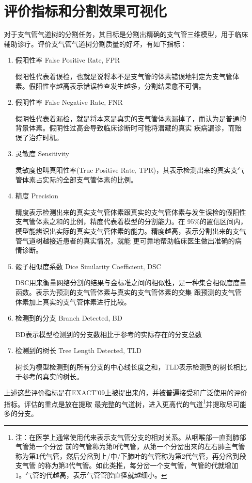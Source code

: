\section{评价指标和分割效果可视化}
对于支气管气道树的分割任务，其目标是分割出精确的支气管三维模型，用于临床辅助诊疗。评价支气管气道树分割质量的好坏，有如下指标：
\begin{enumerate}
    \item 假阳性率 False Positive Rate, FPR
    
    假阳性代表着误检，也就是说将本不是支气管的体素错误地判定为支气管体素。假阳性率越高表示错误检查发生越多，分割结果愈不可信。
    
    \item 假阴性率 False Negative Rate, FNR
    
    假阴性代表着漏检，就是将本来是真实的支气管体素漏掉了，而认为是普通的背景体素。假阴性过高会导致临床诊断时可能将潜藏的真实
    疾病漏诊，而贻误了治疗时机。
    
    \item 灵敏度 Sensitivity
    
    灵敏度也叫真阳性率(True Positive Rate, TPR)，其表示检测出来的真实支气管体素占实际的全部支气管体素的比例。 
    
    \item 精度 Precision
    
    精度表示检测出来的真实支气管体素跟真实的支气管体素与发生误检的假阳性支气管体素之和的比例，精度代表着模型的分割能力。在
    95\%的置信区间内，模型能辨识出实际的真实支气管体素的能力。精度越高，表示分割出来的支气管气道树越接近患者的真实情况，就能
    更可靠地帮助临床医生做出准确的病情诊断。
    
    \item 骰子相似度系数 Dice Similarity Coefficient, DSC
    
    DSC用来衡量网络分割的结果与金标准之间的相似性，是一种集合相似度度量函数。表示为预测的支气管体素与真实的支气管体素的交集
    跟预测的支气管体素加上真实的支气管体素进行比较。
    
    \item 检测到的分支 Branch Detected, BD
    
    BD表示模型检测到的分支数相比于参考的实际存在的分支总数
    
    \item 检测到的树长 Tree Length Detected, TLD
    
    树长为模型检测到的所有分支的中心线长度之和，TLD表示检测到的树长相比于参考的真实的树长。
\end{enumerate}
上述这些评价指标是在EXACT'09\cite{Lo2012ExtractionOA}上被提出来的，并被普遍接受和广泛使用的评价指标。评估的重点是放在提取
最完整的气道树，进入更高代的气道\footnote{注：在医学上通常使用代来表示支气管分支的相对关系。从咽喉部一直到肺部气管第一个分岔
前的气管称为第0代气管，从第一个分岔出来的左右肺主气管称为第1代气管，然后分岔到上/中/下肺叶的气管称为第2代气管，再分岔到段支气管
的称为第3代气管。如此类推，每分岔一个支气管，气管的代就增加1。气管的代越高，表示气管管腔直径就越细小。}并提取尽可能多的分支。

